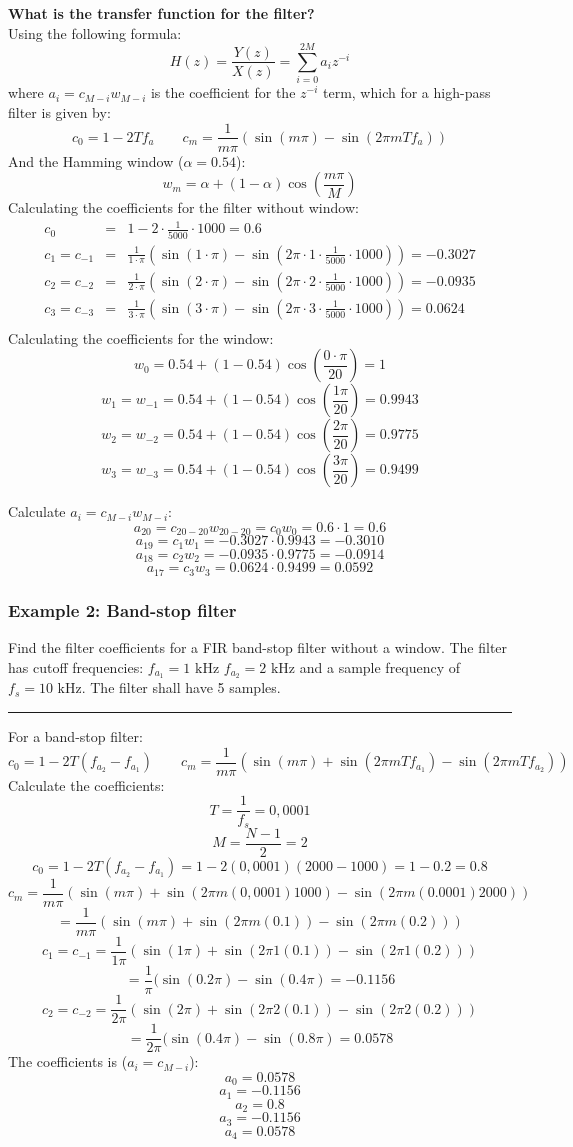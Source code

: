 \textbf{What is the transfer function for the filter?}\\
Using the following formula:
$$H(z)=\frac{Y(z)}{X(z)}=\sum_{i=0}^{2M}a_iz^{-i}$$
where $a_i=c_{M-i}w_{M-i}$ is the coefficient for the $z^{-i}$ term, which for a high-pass filter is given by:
$$c_0=1-2Tf_a\qquad c_m=\frac{1}{m\pi}(\sin(m\pi)-\sin(2\pi m T f_{a}))$$
And the Hamming window ($\alpha=0.54$):
$$w_m=\alpha+(1-\alpha)\cos\left(\frac{m\pi}{M}\right)$$
Calculating the coefficients for the filter without window:
\begin{eqnarray*}
c_0&=&1-2\cdot\frac{1}{5000}\cdot1000=0.6\\
c_1=c_{-1}&=&\frac{1}{1\cdot\pi}\left(\sin(1\cdot\pi)-\sin(2\pi\cdot 1\cdot\frac{1}{5000}\cdot1000)\right)=-0.3027\\
c_2=c_{-2}&=&\frac{1}{2\cdot\pi}\left(\sin(2\cdot\pi)-\sin(2\pi\cdot 2\cdot\frac{1}{5000}\cdot1000)\right)=-0.0935\\
c_3=c_{-3}&=&\frac{1}{3\cdot\pi}\left(\sin(3\cdot\pi)-\sin(2\pi\cdot 3\cdot\frac{1}{5000}\cdot1000)\right)=0.0624\\
\end{eqnarray*}
Calculating the coefficients for the window:
$$w_0=0.54+(1-0.54)\cos\left(\frac{0\cdot\pi}{20}\right)=1$$
$$w_1=w_{-1}=0.54+(1-0.54)\cos\left(\frac{1\pi}{20}\right)=0.9943$$
$$w_2=w_{-2}=0.54+(1-0.54)\cos\left(\frac{2\pi}{20}\right)=0.9775$$
$$w_3=w_{-3}=0.54+(1-0.54)\cos\left(\frac{3\pi}{20}\right)= 0.9499$$

Calculate $a_i=c_{M-i}w_{M-i}$:
$$a_{20}=c_{20-20}w_{20-20}=c_{0}w_{0}=0.6\cdot 1=0.6$$
$$a_{19}=c_1w_1=-0.3027\cdot 0.9943=-0.3010$$
$$a_{18}=c_2w_2=-0.0935\cdot 0.9775=-0.0914$$
$$a_{17}=c_3w_3=0.0624\cdot 0.9499=0.0592$$

\subsubsection{Example 2: Band-stop filter}
Find the filter coefficients for a FIR band-stop filter without a window. 
The filter has cutoff frequencies: $f_{a_1}=1\text{ kHz }f_{a_2}=2\text{ kHz}$ and a sample frequency of $f_s=10\text{ kHz}$.
The filter shall have 5 samples.

\rule{\textwidth}{0.5pt}

For a band-stop filter:
$$c_0=1-2T(f_{a_2}-f_{a_1})\qquad c_m=\frac{1}{m\pi}(\sin(m\pi)+\sin(2\pi m T f_{a_{1}})-\sin(2\pi m T f_{a_{2}}))$$
Calculate the coefficients:
$$T=\frac{1}{f_s}=0,0001$$
$$M=\frac{N-1}{2}=2$$
$$c_0=1-2T(f_{a_2}-f_{a_1})=1-2(0,0001)(2000-1000)=1-0.2=\boxed{0.8}$$
$$c_m=\frac{1}{m\pi}(\sin(m\pi)+\sin(2\pi m (0,0001) 1000)-\sin(2\pi m (0.0001) 2000))$$
$$=\frac{1}{m\pi}(\sin(m\pi)+\sin(2\pi m (0.1))-\sin(2\pi m (0.2)))$$
$$c_1=c_{-1}=\frac{1}{1\pi}(\sin(1\pi)+\sin(2\pi 1 (0.1))-\sin(2\pi 1 (0.2)))$$
$$=\frac{1}{\pi}(\sin(0.2\pi)-\sin(0.4\pi)=\boxed{-0.1156}$$
$$c_2=c_{-2}=\frac{1}{2\pi}(\sin(2\pi)+\sin(2\pi 2 (0.1))-\sin(2\pi 2 (0.2)))$$
$$=\frac{1}{2\pi}(\sin(0.4\pi)-\sin(0.8\pi)=\boxed{0.0578}$$
The coefficients is ($a_i=c_{M-i}$):
$$a_0=0.0578$$
$$a_1=-0.1156$$
$$a_2=0.8$$
$$a_3=-0.1156$$
$$a_4=0.0578$$
